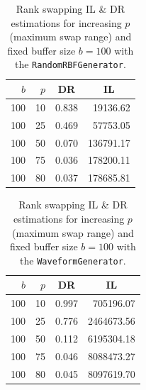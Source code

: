 \begin{minipage}[t]{0.5\textwidth}
	\begin{flushleft}
	\begin{table}[H]
		\centering
		\begin{tabular}{@{}rrrr@{}}
			\toprule
			$b$ & $p$ & \multicolumn{1}{c}{DR} & \multicolumn{1}{c}{IL} \\ \midrule
			100  & 10 & 0.838 & 19136.62  \\
			100  & 25 & 0.469 & 57753.05  \\
			100  & 50 & 0.070 & 136791.17 \\
			100  & 75 & 0.036 & 178200.11 \\
			100  & 80 & 0.037 & 178685.81 \\ \bottomrule
		\end{tabular}
		\caption[Rank swapping DR \& IL estimations (\texttt{RandomRBFGenerator}).]{Rank swapping IL \& DR estimations for increasing $p$ (maximum swap range) and fixed buffer size $b=100$ with the \texttt{RandomRBFGenerator}.}
		\label{table:results-rbf-rankswap}
	\end{table}
	\end{flushleft}
\end{minipage}
\begin{minipage}[t]{0.5\textwidth}
	\begin{flushright}
	\begin{table}[H]
		\centering
		\begin{tabular}{@{}rrrr@{}}
			\toprule
			$b$ & $p$ & \multicolumn{1}{c}{DR} & \multicolumn{1}{c}{IL} \\ \midrule
			100  & 10 & 0.997 & 705196.07  \\
			100  & 25 & 0.776 & 2464673.56 \\
			100  & 50 & 0.112 & 6195304.18 \\
			100  & 75 & 0.046 & 8088473.27 \\
			100  & 80 & 0.045 & 8097619.70 \\ \bottomrule
		\end{tabular}
		\caption[Rank swapping DR \& IL estimations (\texttt{WaveformGenerator}).]{Rank swapping IL \& DR estimations for increasing $p$ (maximum swap range) and fixed buffer size $b=100$ with the \texttt{WaveformGenerator}.}
		\label{table:results-wave-rankswap}
	\end{table}
	\end{flushright}
\end{minipage}

